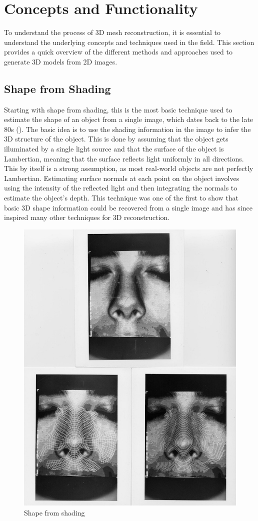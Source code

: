 

\section{Concepts and Functionality}
To understand the process of 3D mesh reconstruction, it is essential to understand the underlying concepts and techniques used in the field. This section provides a quick overview of the different methods and approaches used to generate 3D models from 2D images.

\subsection{Shape from Shading}
Starting with shape from shading, this is the most basic technique used to estimate the shape of an object from a single image, which dates back to the late 80s (\textcite{horn_shape_1989}).
The basic idea is to use the shading information in the image to infer the 3D structure of the object. This is done by assuming that the object gets illuminated by a single light source and that the surface of the object is Lambertian, meaning that the surface reflects light uniformly in all directions. This by itself is a strong assumption, as most real-world objects are not perfectly Lambertian.
Estimating surface normals at each point on the object involves using the intensity of the reflected light and then integrating the normals to estimate the object's depth. This technique was one of the first to show that basic 3D shape information could be recovered from a single image and has since inspired many other techniques for 3D reconstruction.
\begin{figure}
    \centering
    \includegraphics[width=0.5\linewidth]{images/shape_from_shading.jpg}
    \caption{Shape from shading \autocite{horn_shape_1989}}
    \label{fig:shape_from_shading}
\end{figure}

